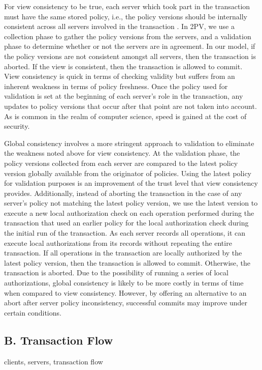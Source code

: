 \documentclass[11pt]{article}
\begin{document}
For view consistency to be true, each server which took part in the transaction must have the same stored policy, i.e., the policy versions should be internally consistent across all servers involved in the transaction \cite{Iskander}. In 2PV, we use a collection phase to gather the policy versions from the servers, and a validation phase to determine whether or not the servers are in agreement. In our model, if the policy versions are not consistent amongst all servers, then the transaction is aborted. If the view is consistent, then the transaction is allowed to commit. View consistency is quick in terms of checking validity but suffers from an inherent weakness in terms of policy freshness. Once the policy used for validation is set at the beginning of each server's role in the transaction, any updates to policy versions that occur after that point are not taken into account. As is common in the realm of computer science, speed is gained at the cost of security.

Global consistency involves a more stringent approach to validation to eliminate the weakness noted above for view consistency. At the validation phase, the policy versions collected from each server are compared to the latest policy version globally available from the originator of policies. Using the latest policy for validation purposes is an improvement of the trust level that view consistency provides. Additionally, instead of aborting the transaction in the case of any server's policy not matching the latest policy version, we use the latest version to execute a new local authorization check on each operation performed during the transaction that used an earlier policy for the local authorization check during the initial run of the transaction. As each server records all operations, it can execute local authorizations from its records without repeating the entire transaction. If all operations in the transaction are locally authorized by the latest policy version, then the transaction is allowed to commit. Otherwise, the transaction is aborted. Due to the possibility of running a series of local authorizations, global consistency is likely to be more costly in terms of time when compared to view consistency. However, by offering an alternative to an abort after server policy inconsistency, successful commits may improve under certain conditions.
\subsection{B. Transaction Flow}
clients, servers, transaction flow
\end{document}
